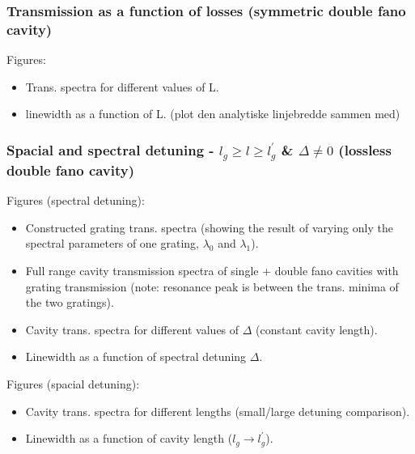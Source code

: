 \subsubsection{Transmission as a function of losses (symmetric double fano cavity)}

Figures:
\begin{itemize}
    \item Trans. spectra for different values of L.
    \item linewidth as a function of L. (plot den analytiske linjebredde sammen med)
\end{itemize}

\subsubsection{Spacial and spectral detuning - $l_{g} \geq l \geq l_{g}^{\prime}$ \& $\Delta \neq 0$ (lossless double fano cavity)}

Figures (spectral detuning): 
\begin{itemize}
    \item Constructed grating trans. spectra (showing the result of varying only the spectral parameters of one grating, $\lambda_0$ and $\lambda_1$).
    \item Full range cavity transmission spectra of single + double fano cavities with grating transmission (note: resonance peak is between the trans. minima of the two gratings).
    \item Cavity trans. spectra for different values of $\Delta$ (constant cavity length).
    \item Linewidth as a function of spectral detuning $\Delta$.
\end{itemize}

Figures (spacial detuning):
\begin{itemize}
    \item Cavity trans. spectra for different lengths (small/large detuning comparison).
    \item Linewidth as a function of cavity length ($l_g \rightarrow l_g^{\prime}$).
\end{itemize}


